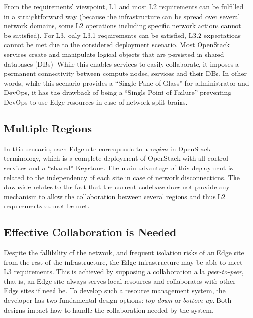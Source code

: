 From the requirements' viewpoint, L1 and most L2 requirements can be
fulfilled in a straightforward way (because the infrastructure can be
spread over several network domains, some L2 operations including
specific network actions cannot be satisfied).  For L3, only L3.1
requirements can be satisfied, L3.2 expectations cannot be met due to
the considered deployment scenario. Most OpenStack services create and
manipulate logical objects that are persisted in shared databases
(DBs).  While this enables services to easily collaborate, it imposes
a permanent connectivity between compute nodes, services and their
DBs.  In other words, while this scenario provides a ``Single Pane of
Glass'' for administrator and DevOps, it has the drawback of being a
``Single Point of Failure'' preventing DevOps to use Edge resources in
case of network split brains.

\subsection{Multiple Regions}
In this scenario, each Edge site corresponds to a \emph{region}
in OpenStack terminology, which is a complete deployment of
OpenStack with all control services and a ``shared'' Keystone.
The main advantage of this deployment is related to the independency
of each site in case of network disconnections.
The downside relates to the fact that the current codebase does not
provide any mechanism to allow the collaboration between several
regions and thus L2 requirements cannot be met.~


\subsection{Effective Collaboration is Needed}
Despite the fallibility of the network, and frequent isolation risks
of an Edge site from the rest of the infrastructure, the Edge
infrastructure may be able to meet L3 requirements. This
is achieved by supposing a collaboration a la \emph{peer-to-peer},
that is, an Edge site always serves local resources and collaborates
with other Edge sites if need be. To develop such a resource
management system, the developer has two fundamental design options:
\emph{top-down} or \emph{bottom-up}. Both designs impact how to handle
the collaboration needed by the system.

